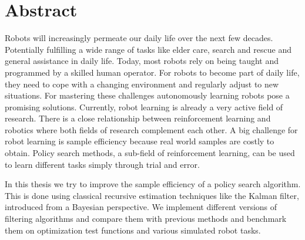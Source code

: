 
\chapter*{Abstract}

Robots will increasingly permeate our daily life over the next few decades.
Potentially fulfilling a wide range of tasks like elder care, search
and rescue and general assistance in daily life.
Today, most robots rely on being
taught and programmed by a skilled human operator.
For robots to become part of daily life, they need to cope
with a changing environment and regularly adjust to new situations.
For mastering these challenges autonomously learning robots pose a
promising solutions.
Currently, robot learning is already
a very active field of research. There is a close
relationship between reinforcement learning and
robotics where both fields of research complement each other.
A big challenge for robot learning is sample efficiency
because real world samples are costly to obtain.
Policy search methods, a sub-field of reinforcement learning,
can be used to learn different tasks simply through trial and error.


In this thesis we try to improve the sample efficiency
of a policy search algorithm.
This is done using classical recursive estimation
techniques like the Kalman filter, introduced from a Bayesian perspective.
We implement different versions of filtering algorithms and compare them with
previous methods and benchmark them on optimization test functions
and various simulated robot tasks.

